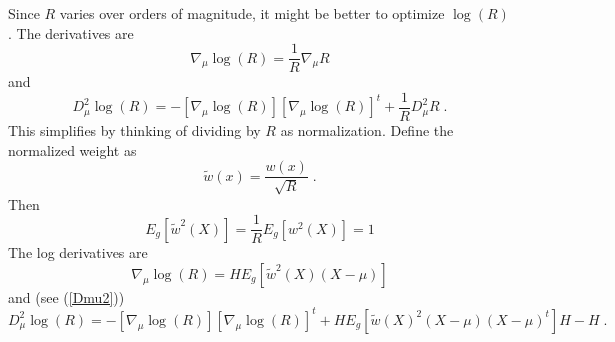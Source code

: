 \documentclass{article}
\begin{document}
Since $R$ varies over orders of magnitude, it might be better to optimize $\log(R)$.
The derivatives are
\[
    \nabla_{\mu} \log(R) = \frac{1}{R} \nabla_{\mu} R
\]
and
\[
      D^2_{\mu} \log(R) = - \left[\nabla_{\mu}\log(R) \right]\left[\nabla_{\mu}\log(R) \right]^t
                          + \frac{1}{R} D^2_{\mu} R \; .
\]
This simplifies by thinking of dividing by $R$ as normalization.
Define the normalized weight as
\[
       \widetilde{w}(x) = \frac{w(x)}{\sqrt{R}} \; .
\]
Then 
\[
   E_g\!\left[ \widetilde{w}^2(X)\right] = \frac{1}{R}  E_g\!\left[w^2(X)\right] = 1
\]
The log derivatives are
\[
      \nabla_{\mu} \log(R) =H  E_g\!\left[ \widetilde{w}^2(X)(X-\mu)\right] 
\]
and (see (\ref{Dmu2}))
\[
      D^2_{\mu} \log(R) = - \left[\nabla_{\mu}\log(R) \right]\left[\nabla_{\mu}\log(R) \right]^t
                        + HE_g\!\left[  \widetilde{w}(X)^2(X-\mu)(X-\mu)^t\right]H - H \; .
\]
\end{document}
